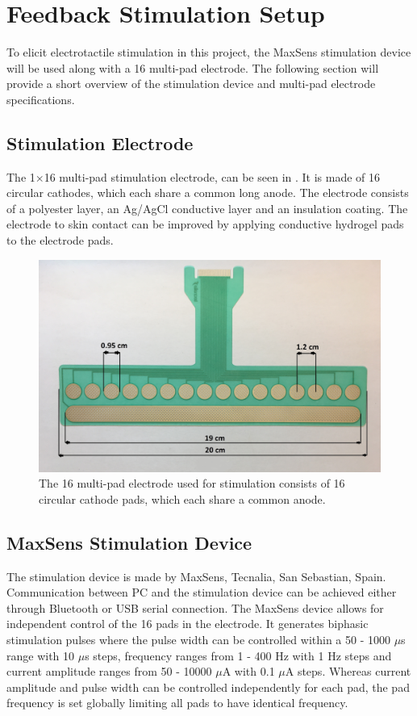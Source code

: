 \section{Feedback Stimulation Setup} \label{Maxxx}

To elicit electrotactile stimulation in this project, the MaxSens stimulation device will be used along with a 16 multi-pad electrode. The following section will provide a short overview of the stimulation device and multi-pad electrode specifications. 
 

\subsection{Stimulation Electrode}

The 1$\times$16 multi-pad stimulation electrode, can be seen in . It is made of 16 circular cathodes, which each share a common long anode. The electrode consists of a polyester layer, an Ag/AgCl conductive layer and an insulation coating. The electrode to skin contact can be improved by applying conductive hydrogel pads to the electrode pads. \cite{Strbac2016}     

\begin{figure}[H]                 
	\includegraphics[width=.57\textwidth]{figures/electrode}  
	\caption{The 16 multi-pad electrode used for stimulation consists of 16 circular cathode pads, which each share a common anode.}
	\label{fig:electrode} 
\end{figure}

\subsection{MaxSens Stimulation Device}

The stimulation device is made by MaxSens, Tecnalia, San Sebastian, Spain. Communication between PC and the stimulation device can be achieved either through Bluetooth or USB serial connection. The MaxSens device allows for independent control of the 16 pads in the electrode. It generates biphasic stimulation pulses where the pulse width can be controlled within a 50 - 1000 $\mu $s range with 10 $\mu $s steps, frequency ranges from 1 - 400 Hz with 1 Hz steps and current amplitude ranges from 50 - 10000 $\mu $A with 0.1 $\mu $A steps. Whereas current amplitude and pulse width can be controlled independently for each pad, the pad frequency is set globally limiting all pads to have identical frequency.    